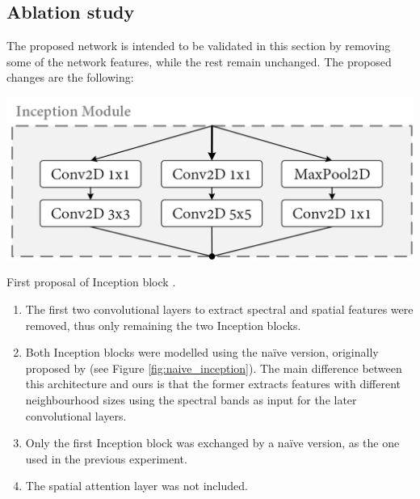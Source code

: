 \subsection{Ablation study}

The proposed network is intended to be validated in this section by removing some of the network features, while the rest remain unchanged. The proposed changes are the following:
\begin{marginfigure}[1.cm]
    \centering
    \includegraphics[width=\linewidth]{figs/vineyard_classification/inception_block.png}
	\caption{First proposal of Inception block \cite{szegedy_going_2014}.}
	\label{fig:naive_inception}
\end{marginfigure}
\begin{enumerate}
    \item The first two convolutional layers to extract spectral and spatial features were removed, thus only remaining the two Inception blocks.
    \item Both Inception blocks were modelled using the naïve version, originally proposed by \cite{szegedy_going_2014} (see Figure \ref{fig:naive_inception}). The main difference between this architecture and ours is that the former extracts features with different neighbourhood sizes using the spectral bands as input for the later convolutional layers.
    \item Only the first Inception block was exchanged by a naïve version, as the one used in the previous experiment.
    \item The spatial attention layer was not included.
\end{enumerate}

